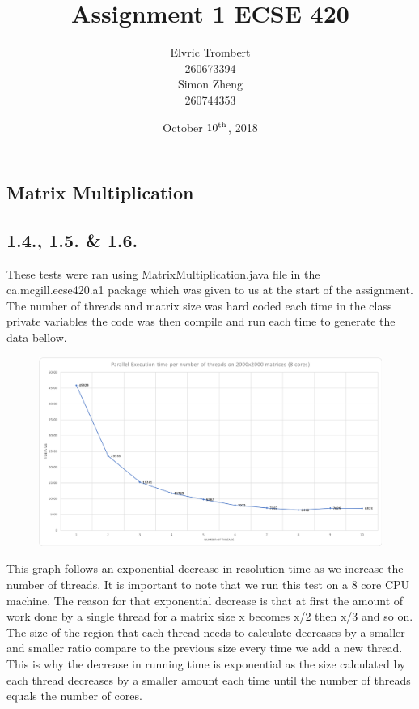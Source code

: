 \documentclass[11pt,letterpaper]{exam}
\author{Elvric Trombert\\260673394\\Simon Zheng\\260744353}%
\title{Assignment 1 ECSE 420}
\date{October $10^{\textnormal{th}}$, 2018}
\begin{document}
	\maketitle
	\hrulefill
	\begin{questions}
		\question
		    \section*{Matrix Multiplication}
		    \subsection*{1.4., 1.5. \& 1.6.}
			These tests were ran using MatrixMultiplication.java file in the ca.mcgill.ecse420.a1 package which was given to us at the start of the assignment. The number of threads and matrix size was hard coded each time in the class private variables the code was then compile and run each time to generate the data bellow.
			\begin{figure}[h!]
				\centering
				\includegraphics[scale=0.5]{ExecutionTimeThread}
			\end{figure}
			This graph follows an exponential decrease in resolution time as we increase the number of threads. It is important to note that we run this test on a 8 core CPU machine. The reason for that exponential decrease is that at first the amount of work done by a single thread for a matrix size x becomes x/2 then x/3 and so on. The size of the region that each thread needs to calculate decreases by a smaller and smaller ratio compare to the previous size every time we add a new thread. This is why the decrease in running time is exponential as the size calculated by each thread decreases by a smaller amount each time until the number of threads equals the number of cores.


\end{questions}
\end{document}
